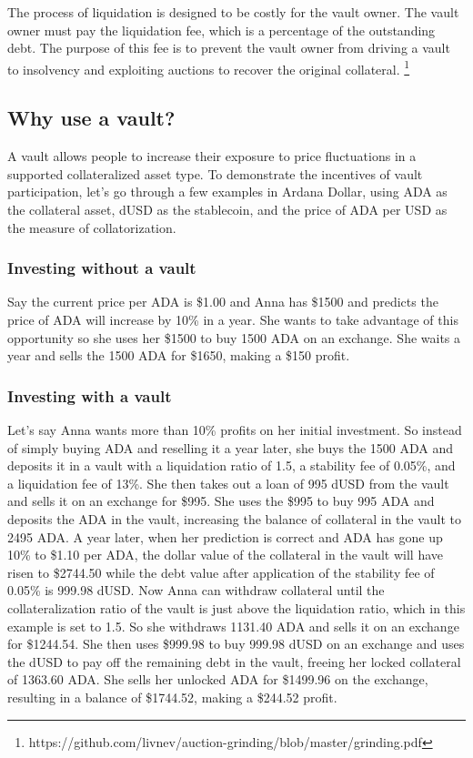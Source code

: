 \documentclass[12pt]{article}
\begin{document}
The process of liquidation is designed to be costly for the vault owner. The vault owner must pay the liquidation fee, which is a percentage of the outstanding debt. The purpose of this fee is to prevent the vault owner from driving a vault to insolvency and exploiting auctions to recover the original collateral. \footnote{https://github.com/livnev/auction-grinding/blob/master/grinding.pdf}
	
\subsection{Why use a vault?}

A vault allows people to increase their exposure to price fluctuations in a supported collateralized asset type. To demonstrate the incentives of vault participation, let's go through a few examples in Ardana Dollar, using ADA as the collateral asset, dUSD as the stablecoin, and the price of ADA per USD as the measure of collatorization.

	\subsubsection{Investing without a vault}

Say the current price per ADA is \$1.00 and Anna has \$1500 and predicts the price of ADA will increase by 10\% in a year. She wants to take advantage of this opportunity so she uses her \$1500 to buy 1500 ADA on an exchange. She waits a year and sells the 1500 ADA for \$1650, making a \$150 profit.

	\subsubsection{Investing with a vault}

Let's say Anna wants more than 10\% profits on her initial investment. So instead of simply buying ADA and reselling it a year later, she buys the 1500 ADA and deposits it in a vault with a liquidation ratio of 1.5, a stability fee of 0.05\%, and a liquidation fee of 13\%. She then takes out a loan of 995 dUSD from the vault and sells it on an exchange for \$995. She uses the \$995 to buy 995 ADA and deposits the ADA in the vault, increasing the balance of collateral in the vault to 2495 ADA. A year later, when her prediction is correct and ADA has gone up 10\% to \$1.10 per ADA, the dollar value of the collateral in the vault will have risen to \$2744.50 while the debt value after application of the stability fee of 0.05\% is 999.98 dUSD. Now Anna can withdraw collateral until the collateralization ratio of the vault is just above the liquidation ratio, which in this example is set to 1.5. So she withdraws 1131.40 ADA and sells it on an exchange for \$1244.54. She then uses \$999.98 to buy 999.98 dUSD on an exchange and uses the dUSD to pay off the remaining debt in the vault, freeing her locked collateral of 1363.60 ADA. She sells her unlocked ADA for \$1499.96 on the exchange, resulting in a balance of \$1744.52, making a \$244.52 profit.
\end{document}
